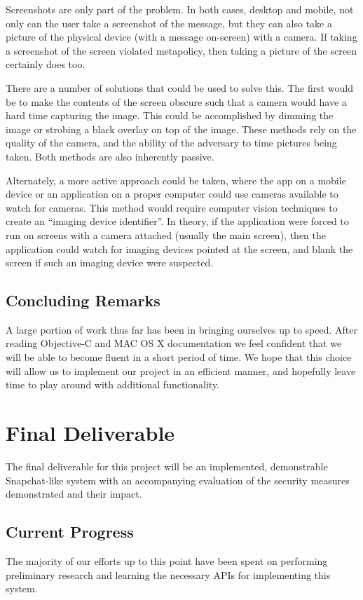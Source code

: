 \documentclass[11pt, a4paper,titlepage]{report}
\begin{document}
Screenshots are only part of the problem. In both cases, desktop and mobile, not only can the user take a screenshot of the message, but they can also take a picture of the physical device (with a message on-screen) with a camera. If taking a screenshot of the screen violated metapolicy, then taking a picture of the screen certainly does too. 

There are a number of solutions that could be used to solve this. The first would be to make the contents of the screen obscure such that a camera would have a hard time capturing the image. This could be accomplished by dimming the image or strobing a black overlay on top of the image. These methods rely on the quality of the camera, and the ability of the adversary to time pictures being taken. Both methods are also inherently passive.

Alternately, a more active approach could be taken, where the app on a mobile device or an application on a proper computer could use cameras available to watch for cameras. This method would require computer vision techniques to create an ``imaging device identifier''. In theory, if the application were forced to run on screens with a camera attached (usually the main screen), then the application could watch for imaging devices pointed at the screen, and blank the screen if such an imaging device were suspected. 

\section{Concluding Remarks}
A large portion of work thus far has been in bringing ourselves up to speed. After reading Objective-C and MAC OS X documentation we feel confident that we will be able to become fluent in a short period of time. We hope that this choice will allow us to implement our project in an efficient manner, and hopefully leave time to play around with additional functionality.

\chapter{Final Deliverable}
The final deliverable for this project will be an implemented, demonstrable Snapchat-like system with an accompanying evaluation of the security measures demonstrated and their impact.
\section{Current Progress}
The majority of our efforts up to this point have been spent on performing preliminary research and learning the necessary APIs for implementing this system.
\end{document}
